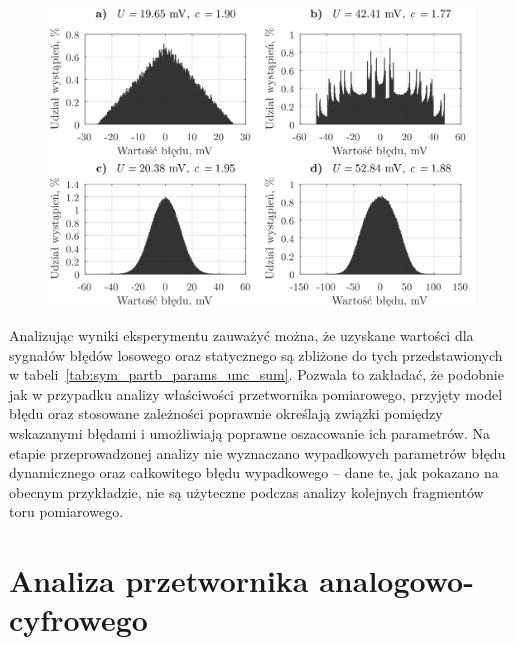 \begin{figure}[htb!]
\begin{center}
\includegraphics{obrazki/hist_part_b}
\end{center}
\end{figure}

Analizując wyniki eksperymentu zauważyć można, że uzyskane wartości dla sygnałów błędów losowego oraz statycznego są zbliżone do tych przedstawionych w tabeli~\ref{tab:sym_partb_params_unc_sum}. Pozwala to zakładać, że podobnie jak w przypadku analizy właściwości przetwornika pomiarowego, przyjęty model błędu oraz stosowane zależności poprawnie określają związki pomiędzy wskazanymi błędami i umożliwiają poprawne oszacowanie ich parametrów. Na etapie przeprowadzonej analizy nie wyznaczano wypadkowych parametrów błędu dynamicznego oraz całkowitego błędu wypadkowego -- dane te, jak pokazano na obecnym przykładzie, nie są użyteczne podczas analizy kolejnych fragmentów toru pomiarowego.

\section{Analiza przetwornika analogowo-cyfrowego}

